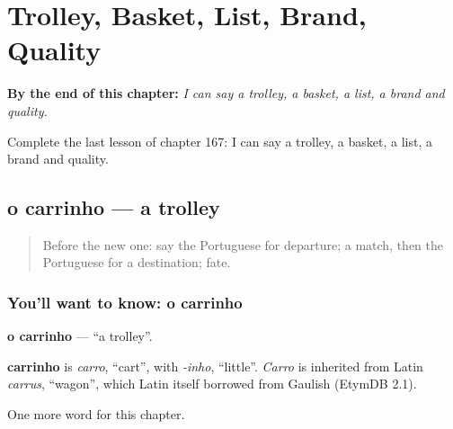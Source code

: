 
\chapter{Trolley, Basket, List, Brand, Quality}
\label{ch:pt-trolley-basket-list-brand-quality}

\begin{chapteropening}
\textbf{By the end of this chapter:} \emph{I can say a trolley, a basket, a list, a brand and quality.}

Complete the last lesson of chapter 167: I can say a trolley, a basket, a list, a brand and quality.
\end{chapteropening}

\section[o carrinho]{o carrinho — a trolley}

\label{lesson:PT-C167-carrinho}



\begin{quote}
Before the new one: say the Portuguese for departure; a match, then the Portuguese for a destination; fate.
\end{quote}

\subsection*{You'll want to know: o carrinho}
\textbf{o carrinho} — \textquotedblleft{}a trolley\textquotedblright{}.

\begin{cousinweb}
\textbf{carrinho} is \emph{carro}, \textquotedblleft{}cart\textquotedblright{}, with \emph{-inho}, \textquotedblleft{}little\textquotedblright{}. \emph{Carro} is inherited from Latin \emph{carrus}, \textquotedblleft{}wagon\textquotedblright{}, which Latin itself borrowed from Gaulish (EtymDB 2.1).
\end{cousinweb}

\begin{grammarlens}[title={What you've built}]
One more word for this chapter.
\end{grammarlens}

